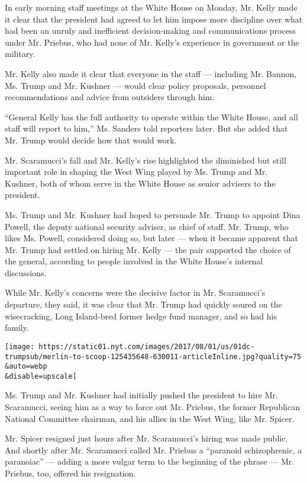In early morning staff meetings at the White House on Monday, Mr. Kelly
made it clear that the president had agreed to let him impose more
discipline over what had been an unruly and inefficient decision-making
and communications process under Mr. Priebus, who had none of Mr.
Kelly's experience in government or the military.

Mr. Kelly also made it clear that everyone in the staff --- including
Mr. Bannon, Ms. Trump and Mr. Kushner --- would clear policy proposals,
personnel recommendations and advice from outsiders through him.

``General Kelly has the full authority to operate within the White
House, and all staff will report to him,'' Ms. Sanders told reporters
later. But she added that Mr. Trump would decide how that would work.

Mr. Scaramucci's fall and Mr. Kelly's rise highlighted the diminished
but still important role in shaping the West Wing played by Ms. Trump
and Mr. Kushner, both of whom serve in the White House as senior
advisers to the president.

Ms. Trump and Mr. Kushner had hoped to persuade Mr. Trump to appoint
Dina Powell, the deputy national security adviser, as chief of staff.
Mr. Trump, who likes Ms. Powell, considered doing so, but later --- when
it became apparent that Mr. Trump had settled on hiring Mr. Kelly ---
the pair supported the choice of the general, according to people
involved in the White House's internal discussions.

While Mr. Kelly's concerns were the decisive factor in Mr. Scaramucci's
departure, they said, it was clear that Mr. Trump had quickly soured on
the wisecracking, Long Island-bred former hedge fund manager, and so had
his family.

\texttt{[image: https://static01.nyt.com/images/2017/08/01/us/01dc-trumpsub/merlin-to-scoop-125435648-630011-articleInline.jpg?quality=75\\\&auto=webp\\\&disable=upscale]}

Ms. Trump and Mr. Kushner had initially pushed the president to hire Mr.
Scaramucci, seeing him as a way to force out Mr. Priebus, the former
Republican National Committee chairman, and his allies in the West Wing,
like Mr. Spicer.

Mr. Spicer resigned just hours after Mr. Scaramucci's hiring was made
public. And shortly after Mr. Scaramucci called Mr. Priebus a ``paranoid
schizophrenic, a paranoiac'' --- adding a more vulgar term to the
beginning of the phrase --- Mr. Priebus, too, offered his resignation.

